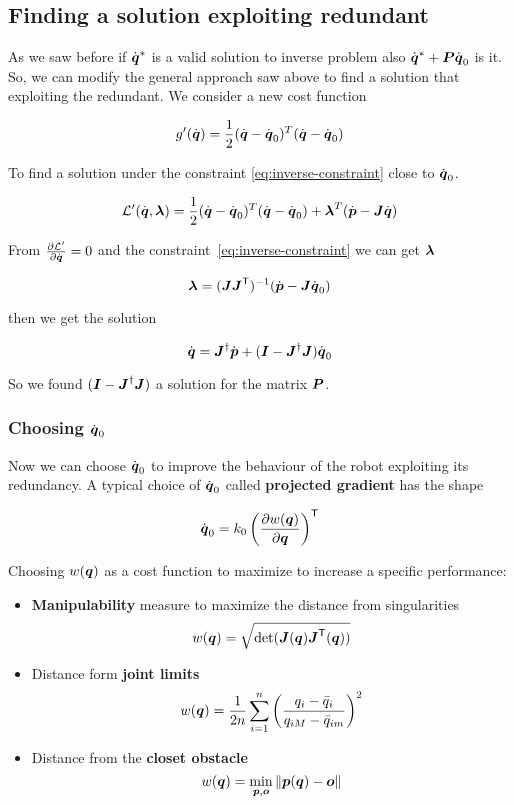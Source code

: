 \subsection{Finding a solution exploiting redundant}

As we saw before if $\dot{\boldsymbol{q}}^*$ is a valid solution to inverse problem also $\dot{\boldsymbol{q}}^* + \boldsymbol{P}\dot{\boldsymbol{q}}_0$ is it.
So, we can modify the general approach saw above to find a solution that exploiting the redundant.
We consider a new cost function

\[ g'(\dot{\boldsymbol{q}}) = \frac{1}{2} (\dot{\boldsymbol{q}} - \dot{\boldsymbol{q}}_0)^T (\dot{\boldsymbol{q}} - \dot{\boldsymbol{q}}_0) \]

To find a solution under the constraint \ref{eq:inverse-constraint} close to $\dot{\boldsymbol{q}}_0$.

\[ \mathcal{L}'(\dot{\boldsymbol{q}}, \boldsymbol{\lambda}) = \frac{1}{2} (\dot{\boldsymbol{q}} - \dot{\boldsymbol{q}}_0)^T (\dot{\boldsymbol{q}} - \dot{\boldsymbol{q}}_0) + \boldsymbol{\lambda}^T (\dot{\boldsymbol{p}} - \boldsymbol{J} \dot{\boldsymbol{q}}) \]

From $\frac{\partial \mathcal{L}'}{\partial \dot{\boldsymbol{q}}} = 0$ and the constraint~\ref{eq:inverse-constraint} we can get $\boldsymbol{\lambda}$

\[\boldsymbol{\lambda} = (\boldsymbol{J}\boldsymbol{J}^{\mathsf{T}})^{-1} (\dot{\boldsymbol{p}} - \boldsymbol{J}\dot{\boldsymbol{q}}_0)\]

then we get the solution

\[ \dot{\boldsymbol{q}} = \boldsymbol{J}^\dag \dot{\boldsymbol{p}} + (\boldsymbol{I} - \boldsymbol{J}^\dag \boldsymbol{J}) \dot{\boldsymbol{q}}_0 \]

So we found $(\boldsymbol{I} - \boldsymbol{J}^\dag \boldsymbol{J})$ a solution for the matrix $\boldsymbol{P}$.

\subsubsection{Choosing $\dot{\boldsymbol{q}}_0$}

Now we can choose $\dot{\boldsymbol{q}}_0$ to improve the behaviour of the robot exploiting its redundancy.
A typical choice of $\dot{\boldsymbol{q}}_0$ called \textbf{projected gradient} has the shape

\[ \dot{\boldsymbol{q}}_0 = k_0 \left(\frac{\partial w(\boldsymbol{q})}{\partial \boldsymbol{q}}\right)^{\mathsf{T}} \]

Choosing $w(\boldsymbol{q})$ as a cost function to maximize to increase a specific performance:

\begin{itemize}
	\item \textbf{Manipulability} measure to maximize the distance from singularities
	\[ w(\boldsymbol{q}) = \sqrt{\det(\boldsymbol{J}(\boldsymbol{q})\boldsymbol{J}^{\mathsf{T}}(\boldsymbol{q}))} \]

	\item Distance form \textbf{joint limits}
	\[ w(\boldsymbol{q}) = \frac{1}{2n} \sum_{i=1}^{n} \left( \frac{q_i - \bar{q}_i}{q_{iM} - \bar{q}_{im}} \right)^2 \]

	\item Distance from the \textbf{closet obstacle}
	\[ w(\boldsymbol{q}) = \min_{\boldsymbol{p},\boldsymbol{o}}\left\lVert\boldsymbol{p}(\boldsymbol{q})-\boldsymbol{o}\right\rVert \]
\end{itemize}

